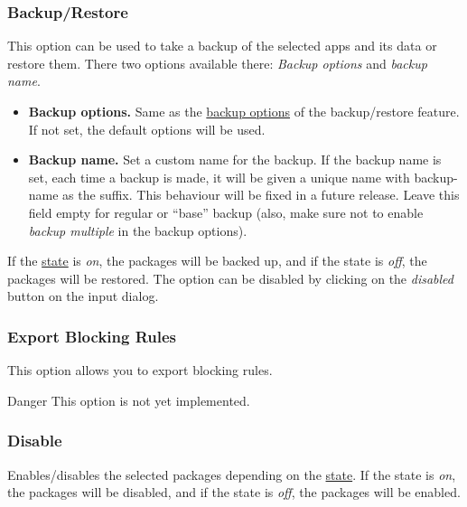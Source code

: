 \subsubsection{Backup/Restore} %
This option can be used to take a backup of the selected apps and its data or restore them. There two options available
there: \textit{Backup options} and \textit{backup name}.
\begin{itemize}
    \item \textbf{Backup options.} Same as the \hyperref[subsec:backup-restore-backup-options]{backup options} of the
    backup/restore feature. If not set, the default options will be used.
    \item \textbf{Backup name.} Set a custom name for the backup. If the backup name is set, each time a backup is made,
    it will be given a unique name with backup-name as the suffix. This behaviour will be fixed in a future release.
    Leave this field empty for regular or ``base'' backup (also, make sure not to enable \textit{backup multiple} in the
    backup options).
\end{itemize}

If the \hyperref[subsubsec:profile-state]{state} is \textit{on}, the packages will be backed up, and if the state is
\textit{off}, the packages will be restored. The option can be disabled by clicking on the \textit{disabled} button on
the input dialog.

\subsubsection{Export Blocking Rules} %
This option allows you to export blocking rules.

\begin{danger}{Danger}
    This option is not yet implemented.
\end{danger}

\subsubsection{Disable} %
Enables/disables the selected packages depending on the \hyperref[subsubsec:profile-state]{state}. If the state is
\textit{on}, the packages will be disabled, and if the state is \textit{off}, the packages will be enabled.

